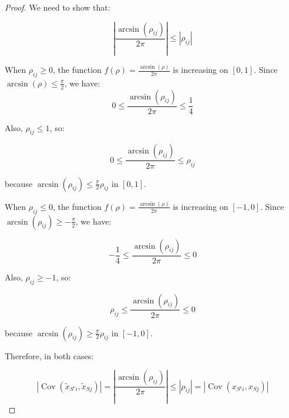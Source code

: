 \begin{proof}
We need to show that:

\begin{equation}\label{eq:app-lemma3-arcsin-bound-goal}
\left| \frac{\arcsin(\rho_{ij})}{2\pi} \right| \leq |\rho_{ij}|
\end{equation}

When $ \rho_{ij} \geq 0 $, the function $ f(\rho) = \frac{\arcsin(\rho)}{2\pi} $ is increasing on $ [0, 1] $. Since $ \arcsin(\rho) \leq \frac{\pi}{2} $, we have:
\begin{equation}\label{eq:app-lemma3-positive-arcsin-bound}
0 \leq \frac{\arcsin(\rho_{ij})}{2\pi} \leq \frac{1}{4}
\end{equation}

Also, $ \rho_{ij} \leq 1 $, so:

\begin{equation}\label{eq:app-lemma3-positive-covariance-bound}
0 \leq \frac{\arcsin(\rho_{ij})}{2\pi} \leq \rho_{ij}
\end{equation}

because $ \arcsin(\rho_{ij}) \leq \frac{\pi}{2} \rho_{ij} $ in $ [0, 1] $.

When $ \rho_{ij} \leq 0 $, the function $ f(\rho) = \frac{\arcsin(\rho)}{2\pi} $ is increasing on $ [-1, 0] $. Since $ \arcsin(\rho_{ij}) \geq -\frac{\pi}{2} $, we have:

\begin{equation}\label{eq:app-lemma3-negative-arcsin-bound}
-\frac{1}{4} \leq \frac{\arcsin(\rho_{ij})}{2\pi} \leq 0
\end{equation}

Also, $ \rho_{ij} \geq -1 $, so:

\begin{equation}\label{eq:app-lemma3-negative-covariance-bound}
\rho_{ij} \leq \frac{\arcsin(\rho_{ij})}{2\pi} \leq 0
\end{equation}

because $ \arcsin(\rho_{ij}) \geq \frac{\pi}{2} \rho_{ij} $ in $ [-1, 0] $.

Therefore, in both cases:

\begin{equation}\label{eq:app-lemma3-final-covariance-contraction}
\left| \operatorname{Cov}(\tilde{x}_{{S^c}i}, \tilde{x}_{Sj}) \right| = \left| \frac{\arcsin(\rho_{ij})}{2\pi} \right| \leq |\rho_{ij}| = \left| \operatorname{Cov}(x_{{S^c}i}, x_{Sj}) \right|
\end{equation}
\end{proof}

